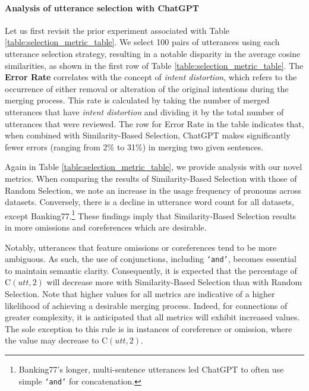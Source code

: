 \paragraph{Analysis of utterance selection with ChatGPT} 
Let us first revisit the prior experiment associated with Table \ref{table:selection_metric_table}.
We select 100 pairs of utterances using each utterance selection strategy, resulting in a notable disparity in the average cosine similarities, as shown in the first row of Table \ref{table:selection_metric_table}.
The \textbf{Error Rate} correlates with the concept of \textit{intent distortion}, which refers to the occurrence of either removal or alteration of the original intentions during the merging process. 
This rate is calculated by taking the number of merged utterances that have \textit{intent distortion} and dividing it by the total number of utterances that were reviewed.
The row for Error Rate in the table indicates that, when combined with Similarity-Based Selection, ChatGPT makes significantly fewer errors (ranging from 2\% to 31\%) in merging two given sentences.

Again in Table \ref{table:selection_metric_table}, we provide analysis with our novel metrics. 
When comparing the results of Similarity-Based Selection with those of Random Selection, we note an increase in the usage frequency of pronouns across datasets. Conversely, there is a decline in utterance word count for all datasets, except Banking77.\footnote{
Banking77's longer, multi-sentence utterances led ChatGPT to often use simple \texttt{`and'} for concatenation.}
These findings imply that Similarity-Based Selection results in more omissions and coreferences which are desirable.

Notably, utterances that feature omissions or coreferences tend to be more ambiguous. 
As such, the use of conjunctions, including \texttt{`and'}, becomes essential to maintain semantic clarity. 
Consequently, it is expected that the percentage of $\mathrm{C}(utt,2)$ will decrease more with Similarity-Based Selection than with Random Selection.
Note that higher values for all metrics are indicative of a higher likelihood of achieving a desirable merging process.
Indeed, for connections of greater complexity, it is anticipated that all metrics will exhibit increased values. 
The sole exception to this rule is in instances of coreference or omission, where the value may decrease to $\mathrm{C}(utt,2)$.

